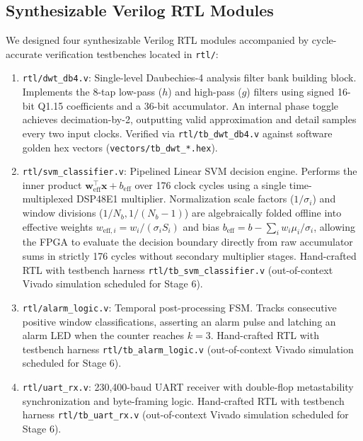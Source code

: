 \documentclass[10pt,twocolumn,letterpaper]{article}
\begin{document}
{\subsection{Synthesizable Verilog RTL Modules}
We designed four synthesizable Verilog RTL modules accompanied by cycle-accurate verification testbenches located in \texttt{rtl/}:
\begin{enumerate}
    \item \texttt{rtl/dwt\_db4.v}: Single-level Daubechies-4 analysis filter bank building block. Implements the 8-tap low-pass ($h$) and high-pass ($g$) filters using signed 16-bit Q1.15 coefficients and a 36-bit accumulator. An internal phase toggle achieves decimation-by-2, outputting valid approximation and detail samples every two input clocks. Verified via \texttt{rtl/tb\_dwt\_db4.v} against software golden hex vectors (\texttt{vectors/tb\_dwt\_*.hex}).
    \item \texttt{rtl/svm\_classifier.v}: Pipelined Linear SVM decision engine. Performs the inner product $\mathbf{w}_{\text{eff}}^\top \mathbf{x} + b_{\text{eff}}$ over 176 clock cycles using a single time-multiplexed DSP48E1 multiplier. Normalization scale factors ($1/\sigma_i$) and window divisions ($1/N_b, 1/(N_b-1)$) are algebraically folded offline into effective weights $w_{\text{eff},i} = w_i / (\sigma_i S_i)$ and bias $b_{\text{eff}} = b - \sum_i w_i \mu_i / \sigma_i$, allowing the FPGA to evaluate the decision boundary directly from raw accumulator sums in strictly 176 cycles without secondary multiplier stages. Hand-crafted RTL with testbench harness \texttt{rtl/tb\_svm\_classifier.v} (out-of-context Vivado simulation scheduled for Stage 6).
    \item \texttt{rtl/alarm\_logic.v}: Temporal post-processing FSM. Tracks consecutive positive window classifications, asserting an alarm pulse and latching an alarm LED when the counter reaches $k=3$. Hand-crafted RTL with testbench harness \texttt{rtl/tb\_alarm\_logic.v} (out-of-context Vivado simulation scheduled for Stage 6).
    \item \texttt{rtl/uart\_rx.v}: 230,400-baud UART receiver with double-flop metastability synchronization and byte-framing logic. Hand-crafted RTL with testbench harness \texttt{rtl/tb\_uart\_rx.v} (out-of-context Vivado simulation scheduled for Stage 6).
\end{enumerate}

}
\end{document}
